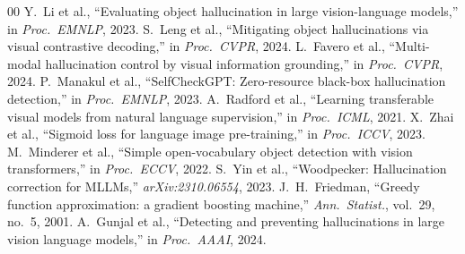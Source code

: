 \documentclass[conference]{IEEEtran}
\begin{document}
\begin{thebibliography}{00}
 Y.~Li et al., ``Evaluating object hallucination in large
vision-language models,'' in \textit{Proc.\ EMNLP}, 2023.
 S.~Leng et al., ``Mitigating object hallucinations via visual
contrastive decoding,'' in \textit{Proc.\ CVPR}, 2024.
 L.~Favero et al., ``Multi-modal hallucination control by
visual information grounding,'' in \textit{Proc.\ CVPR}, 2024.
 P.~Manakul et al., ``SelfCheckGPT: Zero-resource
black-box hallucination detection,'' in \textit{Proc.\ EMNLP}, 2023.
 A.~Radford et al., ``Learning transferable visual models
from natural language supervision,'' in \textit{Proc.\ ICML}, 2021.
 X.~Zhai et al., ``Sigmoid loss for language image
pre-training,'' in \textit{Proc.\ ICCV}, 2023.
 M.~Minderer et al., ``Simple open-vocabulary object
detection with vision transformers,'' in \textit{Proc.\ ECCV}, 2022.
 S.~Yin et al., ``Woodpecker: Hallucination correction
for MLLMs,'' \textit{arXiv:2310.06554}, 2023.
 J.~H.~Friedman, ``Greedy function approximation: a
gradient boosting machine,'' \textit{Ann.\ Statist.}, vol.~29, no.~5, 2001.
 A.~Gunjal et al., ``Detecting and preventing
hallucinations in large vision language models,'' in \textit{Proc.\ AAAI}, 2024.
\end{thebibliography}
\end{document}

